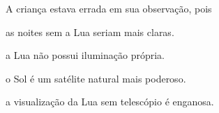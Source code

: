 A criança estava errada em sua observação, pois

\begin{escolha}
\item as noites sem a Lua seriam mais claras.

\item a Lua não possui iluminação própria.

\item o Sol é um satélite natural mais poderoso.

\item a visualização da Lua sem telescópio é enganosa.
\end{escolha}

